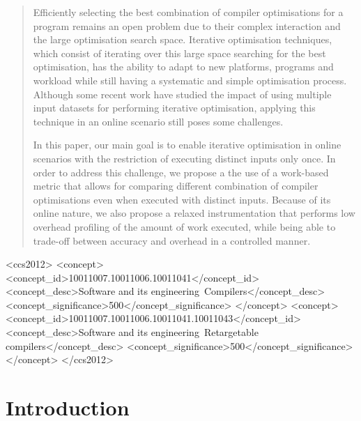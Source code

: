 \documentclass[sigplan,9pt]{acmart}
\begin{document}
\begin{abstract}
Efficiently selecting the best combination of compiler optimisations for a program
remains an open problem due to their complex interaction and the large optimisation search space.
Iterative optimisation techniques, which consist of iterating
over this large space searching for the best optimisation,
has the ability to adapt to new platforms, programs and workload while still
having a systematic and simple optimisation process.
Although some recent work have studied the impact of using multiple
input datasets for performing iterative optimisation, applying this
technique in an online scenario still poses some challenges.

In this paper, our main goal is to enable iterative optimisation in
online scenarios with the restriction of executing distinct inputs
only once.
In order to address this challenge,
we propose a the use of a work-based metric that allows for comparing different
combination of compiler optimisations even when executed with distinct inputs.
Because of its online nature, we also propose a relaxed instrumentation
that performs low overhead profiling of the amount of work executed, while
being able to trade-off between accuracy and overhead in a controlled manner.
\end{abstract}

%
%
\begin{CCSXML}
<ccs2012>
<concept>
<concept_id>10011007.10011006.10011041</concept_id>
<concept_desc>Software and its engineering~Compilers</concept_desc>
<concept_significance>500</concept_significance>
</concept>
<concept>
<concept_id>10011007.10011006.10011041.10011043</concept_id>
<concept_desc>Software and its engineering~Retargetable compilers</concept_desc>
<concept_significance>500</concept_significance>
</concept>
</ccs2012>
\end{CCSXML}




\maketitle

\section{Introduction}
\end{document}
